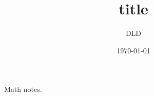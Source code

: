 \documentclass[11pt,reqno]{amsart}
\title{title}
\author{DLD}
\date{\today}
\theoremstyle{plain}
\theoremstyle{definition}
\begin{document}
\maketitle

Math notes.

\vspace{20 mm}


\end{document}
